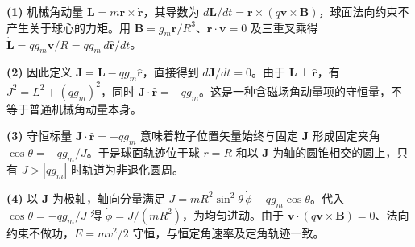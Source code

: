 \par\noindent\textbf{(1)} 机械角动量 \(\boldsymbol L=m\boldsymbol r\times\dot{\boldsymbol r}\)，其导数为 \(d\boldsymbol L/dt=\boldsymbol r\times(q\boldsymbol v\times\boldsymbol B)\)，球面法向约束不产生关于球心的力矩。用 \(\boldsymbol B=g_m\boldsymbol r/R^3\)、\(\boldsymbol r\cdot\boldsymbol v=0\) 及三重叉乘得 \(\dot{\boldsymbol L}=qg_m\boldsymbol v/R=qg_m\,d\hat{\boldsymbol r}/dt\)。
\par\noindent\textbf{(2)} 因此定义 \(\boldsymbol J=\boldsymbol L-qg_m\hat{\boldsymbol r}\)，直接得到 \(d\boldsymbol J/dt=0\)。由于 \(\boldsymbol L\perp\hat{\boldsymbol r}\)，有 \(J^2=L^2+(qg_m)^2\)，同时 \(\boldsymbol J\cdot\hat{\boldsymbol r}=-qg_m\)。这是一种含磁场角动量项的守恒量，不等于普通机械角动量本身。
\par\noindent\textbf{(3)} 守恒标量 \(\boldsymbol J\cdot\hat{\boldsymbol r}=-qg_m\) 意味着粒子位置矢量始终与固定 \(\boldsymbol J\) 形成固定夹角 \(\cos\theta=-qg_m/J\)。于是球面轨迹位于球 \(r=R\) 和以 \(\boldsymbol J\) 为轴的圆锥相交的圆上，只有 \(J>|qg_m|\) 时轨道为非退化圆周。
\par\noindent\textbf{(4)} 以 \(\boldsymbol J\) 为极轴，轴向分量满足 \(J=mR^2\sin^2\theta\,\dot\phi-qg_m\cos\theta\)。代入 \(\cos\theta=-qg_m/J\) 得 \(\dot\phi=J/(mR^2)\)，为均匀进动。由于 \(\boldsymbol v\cdot(q\boldsymbol v\times\boldsymbol B)=0\)、法向约束不做功，\(E=mv^2/2\) 守恒，与恒定角速率及定角轨迹一致。
